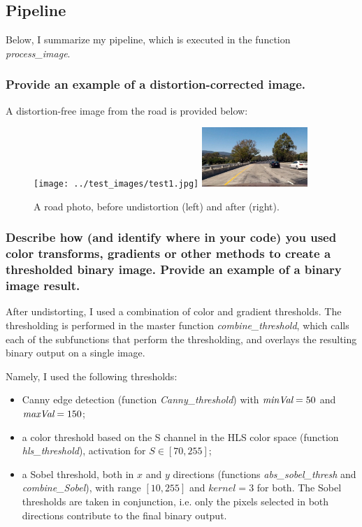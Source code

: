 \documentclass[a4paper,10pt]{article}
\begin{document}
\subsection{Pipeline}

Below, I summarize my pipeline, which is executed in the function \emph{process\_image}.

\subsubsection{Provide an example of a distortion-corrected image.}

A distortion-free image from the road is provided below:

\begin{figure}[h]
  \begin{center}
    \texttt{[image: ../test\_images/test1.jpg]}
    \quad
    \includegraphics[width=40mm]{../output_images/undistorted.jpg}
  \caption{A road photo, before undistortion (left) and after (right).}
\end{center}
\end{figure}

\subsubsection{Describe how (and identify where in your code) you used color transforms, gradients or other methods to create a thresholded binary image. 
Provide an example of a binary image result.}

After undistorting, I used a combination of color and gradient thresholds. The thresholding is performed in the master function \emph{combine\_threshold},
which calls each of the subfunctions that perform the thresholding, and overlays the resulting binary output on a single image.

Namely, I used the following thresholds:
%
\begin{itemize}
  \item Canny edge detection (function \emph{Canny\_threshold}) with $\emph{minVal}=50$ and  $\emph{maxVal}=150$;
  \item a color threshold based on the S channel in the HLS color space (function \emph{hls\_threshold}), activation for $S \in [70,255]$;
  \item a Sobel threshold, both in $x$ and $y$ directions (functions \emph{abs\_sobel\_thresh} and \emph{combine\_Sobel}), with range $[10,255]$ and $kernel=3$
    for both. The Sobel thresholds are taken in conjunction, i.e. only the pixels selected in both directions contribute to the final binary output.
\end{itemize}
\end{document}
